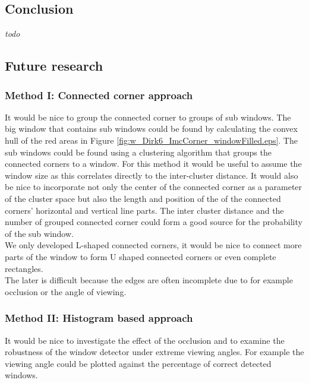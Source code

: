 \subsection{Conclusion}
\emph{todo}

\subsection{Future research}
\subsubsection{Method I: Connected corner approach} 
It would be nice to group the connected corner to groups of sub windows.
The big window that contains sub windows could be found by calculating the convex hull of the red areas in 
Figure \ref{fig:w_Dirk6_ImcCorner_windowFilled.eps}.
The sub windows could be found using a clustering algorithm that groups the connected corners to
a window. For this method it would be useful to assume the window size as this
correlates directly to the inter-cluster distance.
It would also be nice to incorporate not only the center of the connected corner
as a parameter of the cluster space but also the length and position of the of
the connected corners' horizontal and vertical line parts.  The inter cluster
distance and the number of grouped connected corner could form a good source for
the probability of the sub window.\\

We only developed L-shaped connected corners, it would be nice to connect more
parts of the window to form U shaped connected corners or even complete rectangles.\\
The later is difficult because the edges are often incomplete due to for example occlusion 
or the angle of viewing.


\subsubsection{Method II: Histogram based approach} 
It would be nice to investigate the effect of the occlusion and to examine the
robustness of the window detector under extreme viewing angles.
For example the viewing angle could be plotted against the percentage of
correct detected windows.


